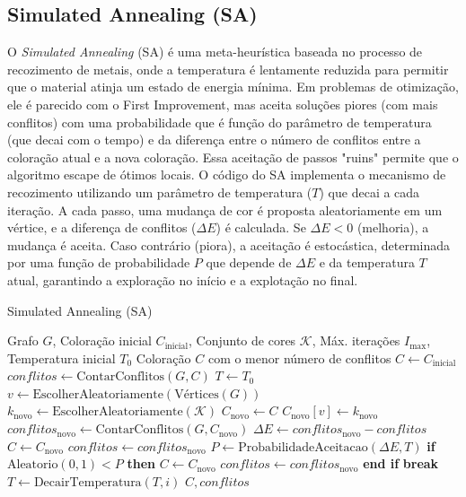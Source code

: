 \documentclass[12pt,a4paper]{article}
\begin{document}
\subsection{Simulated Annealing (SA)}
O \textit{Simulated Annealing} (SA) é uma meta-heurística baseada no processo de recozimento de metais, onde a temperatura é lentamente reduzida para permitir que o material atinja um estado de energia mínima. Em problemas de otimização, ele é parecido com o First Improvement, mas aceita soluções piores (com mais conflitos) com uma probabilidade que é função do parâmetro de temperatura (que decai com o tempo) e da diferença entre o número de conflitos entre a coloração atual e a nova coloração. Essa aceitação de passos "ruins" permite que o algoritmo escape de ótimos locais.
O código do SA implementa o mecanismo de recozimento utilizando um parâmetro de temperatura ($T$) que decai a cada iteração. A cada passo, uma mudança de cor é proposta aleatoriamente em um vértice, e a diferença de conflitos ($\Delta E$) é calculada. Se $\Delta E < 0$ (melhoria), a mudança é aceita. Caso contrário (piora), a aceitação é estocástica, determinada por uma função de probabilidade $P$ que depende de $\Delta E$ e da temperatura $T$ atual, garantindo a exploração no início e a explotação no final.
\begin{algorithm}[H]
\caption{Simulated Annealing (SA)}
\label{alg:simulated_annealing}
\begin{algorithmic}[1]
\Require Grafo \(G\), Coloração inicial \(C_{\text{inicial}}\), Conjunto de cores \(\mathcal{K}\), Máx. iterações \(I_{\max}\), Temperatura inicial \(T_0\)
\Ensure Coloração \(C\) com o menor número de conflitos
\State \(C \gets C_{\text{inicial}}\)
\State \(conflitos \gets \text{ContarConflitos}(G, C)\)
\State \(T \gets T_0\)
    \State \(v \gets \text{EscolherAleatoriamente}(\text{Vértices}(G))\)
    \State \(k_{\text{novo}} \gets \text{EscolherAleatoriamente}(\mathcal{K})\)
    \State \(C_{\text{novo}} \gets C\)
    \State \(C_{\text{novo}}[v] \gets k_{\text{novo}}\)
    \State \(conflitos_{\text{novo}} \gets \text{ContarConflitos}(G, C_{\text{novo}})\)
    \State \(\Delta E \gets conflitos_{\text{novo}} - conflitos\) 
     
        \State \(C \gets C_{\text{novo}}\)
        \State \(conflitos \gets conflitos_{\text{novo}}\)
    \Else
        \State \(P \gets \text{ProbabilidadeAceitacao}(\Delta E, T)\)
        \State \textbf{if} \(\text{Aleatorio}(0,1) < P\) \textbf{then}
            \State \hspace{1.5em} \(C \gets C_{\text{novo}}\) 
            \State \hspace{1.5em} \(conflitos \gets conflitos_{\text{novo}}\)
        \State \textbf{end if}
    \EndIf
     \State \textbf{break} \EndIf
    \State \(T \gets \text{DecairTemperatura}(T, i)\)
\EndFor
\State \Return \(C, conflitos\)
\end{algorithmic}
\end{algorithm}
\end{document}
